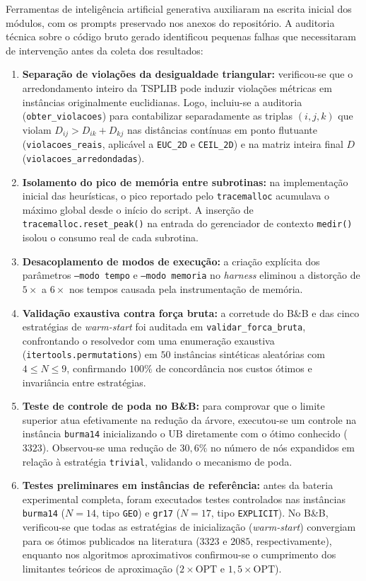 \documentclass[12pt]{article}
\begin{document}
Ferramentas de inteligência artificial generativa auxiliaram na escrita inicial dos módulos, com os prompts preservado nos anexos do repositório. A auditoria técnica sobre o código bruto gerado identificou pequenas falhas que necessitaram de intervenção antes da coleta dos resultados:

\begin{enumerate}
    \item \textbf{Separação de violações da desigualdade triangular:} verificou-se que o arredondamento inteiro da TSPLIB pode induzir violações métricas em instâncias originalmente euclidianas. Logo, incluiu-se a auditoria (\texttt{obter\_violacoes}) para contabilizar separadamente as triplas $(i, j, k)$ que violam $D_{ij} > D_{ik} + D_{kj}$ nas distâncias contínuas em ponto flutuante (\texttt{violacoes\_reais}, aplicável a \texttt{EUC\_2D} e \texttt{CEIL\_2D}) e na matriz inteira final $D$ (\texttt{violacoes\_arredondadas}).
    \item \textbf{Isolamento do pico de memória entre subrotinas:} na implementação inicial das heurísticas, o pico reportado pelo \texttt{tracemalloc} acumulava o máximo global desde o início do script. A inserção de \texttt{tracemalloc.reset\_peak()} na entrada do gerenciador de contexto \texttt{medir()} isolou o consumo real de cada subrotina.
    \item \textbf{Desacoplamento de modos de execução:} a criação explícita dos parâmetros \texttt{--modo tempo} e \texttt{--modo memoria} no \textit{harness} eliminou a distorção de $5\times$ a $6\times$ nos tempos causada pela instrumentação de memória.
    \item \textbf{Validação exaustiva contra força bruta:} a corretude do B\&B e das cinco estratégias de \textit{warm-start} foi auditada em \texttt{validar\_forca\_bruta}, confrontando o resolvedor com uma enumeração exaustiva (\texttt{itertools.permutations}) em $50$ instâncias sintéticas aleatórias com $4 \le N \le 9$, confirmando $100\%$ de concordância nos custos ótimos e invariância entre estratégias.
    \item \textbf{Teste de controle de poda no B\&B:} para comprovar que o limite superior atua efetivamente na redução da árvore, executou-se um controle na instância \texttt{burma14} inicializando o $\text{UB}$ diretamente com o ótimo conhecido ($3323$). Observou-se uma redução de $30{,}6\%$ no número de nós expandidos em relação à estratégia \texttt{trivial}, validando o mecanismo de poda.
    \item \textbf{Testes preliminares em instâncias de referência:} antes da bateria experimental completa, foram executados testes controlados nas instâncias \texttt{burma14} ($N=14$, tipo \texttt{GEO}) e \texttt{gr17} ($N=17$, tipo \texttt{EXPLICIT}). No B\&B, verificou-se que todas as estratégias de inicialização (\textit{warm-start}) convergiam para os ótimos publicados na literatura ($3323$ e $2085$, respectivamente), enquanto nos algoritmos aproximativos confirmou-se o cumprimento dos limitantes teóricos de aproximação ($2 \times \text{OPT}$ e $1{,}5 \times \text{OPT}$).
\end{enumerate}
\end{document}
